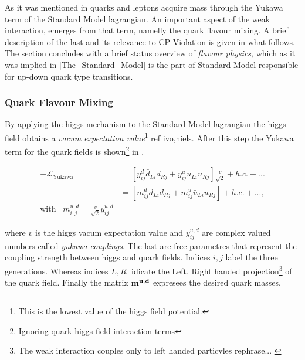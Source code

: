 As it was mentioned in  quarks and leptons acquire mass through the Yukawa term
of the Standard Model lagrangian. An important aspect of the weak interaction, emerges from that term,
namelly the quark flavour mixing. A brief description of the last and its relevance to CP-Violation is given in what follows.
The section concludes with a brief status overview of {\it flavour physics}, which as it was implied in \ref{The_Standard_Model}
is the part of Standard Model responsible for up-down quark type transitions.

\subsubsection{Quark Flavour Mixing}
By applying the higgs mechanism to the Standard Model lagrangian the higgs field obtains a
{\it vacum expectation value}\footnote{This is the lowest value of the higgs field potential.} {\color{red} ref ivo,niels}.
After this step the Yukawa term for the quark fields is
shown\footnote{Ignoring quark-higgs field interaction terms} in .

\begin{subequations}
\label{yukawa_flavour}
  \begin{align}
  -\mathscr{L}_{\text{Yukawa}} &= \left[ y_{ij}^d \bar{d}_{Li} d_{Rj} + y_{ij}^u \bar{u}_{Li} u_{Rj} \right] \frac{v}{\sqrt{2}} + h.c. + ...  \\
                               &= \left[ m_{ij}^d \bar{d}_{Li} d_{Rj} + m_{ij}^u \bar{u}_{Li} u_{Rj} \right] + h.c. + ...,  \\
                               \text{with} \;\;\; m^{u,d}_{i,j} = \frac{v}{\sqrt{2}} y_{ij}^{u,d} & \nonumber
  \end{align}
\end{subequations}

\noindent where $v$ is the higgs vacum expectation value and $y_{ij}^{u,d}$ are complex valued numbers called {\it yukawa couplings}.
The last are free parametres that represent the coupling strength between higgs and quark fields.
Indices $i,j$ label the three generations. Whereas indices $L,R\;$ idicate the Left, Right handed
projection\footnote{The weak interaction couples only to left handed particvles {\color{red} rephrase... }} of the quark field.
Finally the matrix $\bf m^{u,d}$ expresees the desired quark masses.

